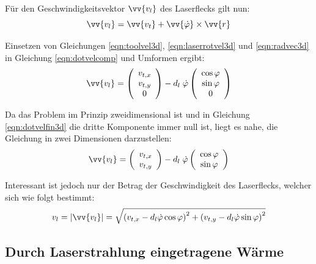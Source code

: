 Für den Geschwindigkeitsvektor $\vv{v_l}$ des Laserflecks gilt nun:
\begin{equation}
 \vv{v_l} = \vv{v_t} + \vv{\dot{\varphi}} \times \vv{r}
 \label{eqn:dotvelcomp}
\end{equation}

Einsetzen von Gleichungen \ref{eqn:toolvel3d}, \ref{eqn:laserrotvel3d} und \ref{eqn:radvec3d} in Gleichung \ref{eqn:dotvelcomp} und Umformen ergibt:
\begin{equation}
 \vv{v_l} = \left(\begin{array}{c}v_{t,x}\\v_{t,y}\\0\end{array}\right) - d_l\; \dot{\varphi} \left(\begin{array}{c}\cos\varphi\\\sin\varphi\\0\end{array}\right)
 \label{eqn:dotvelfin3d}
\end{equation}

Da das Problem im Prinzip zweidimensional ist und in Gleichung \ref{eqn:dotvelfin3d} die dritte Komponente immer null ist, liegt es nahe, die Gleichung in zwei Dimensionen darzustellen:
\begin{equation}
 \vv{v_l} = \left(\begin{array}{c}v_{t,x}\\v_{t,y}\end{array}\right) - d_l\; \dot{\varphi} \left(\begin{array}{c}\cos\varphi\\\sin\varphi\end{array}\right)
 \label{eqn:dotvelfin2d}
\end{equation}

Interessant ist jedoch nur der Betrag der Geschwindigkeit des Laserflecks, welcher sich wie folgt bestimmt:
\begin{equation}
 v_l = \left|\vv{v_l}\right| = \sqrt{\left(v_{t,x} - d_l\dot\varphi\cos\varphi\right)^2 + \left(v_{t,y} - d_l\dot\varphi\sin\varphi\right)^2}
 \label{eqn:dotvelabs}
\end{equation}

\label{sec:geotheory}

\subsection{Durch Laserstrahlung eingetragene Wärme}

